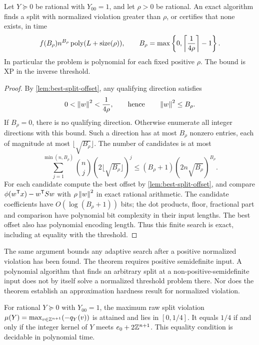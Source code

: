 \begin{theorem}\label{thm:threshold-separation}
Let $Y\succeq0$ be rational with $Y_{00}=1$, and let $\rho>0$ be rational.
An exact algorithm finds a split with normalized violation greater than
$\rho$, or certifies that none exists, in time
\[
 f(B_\rho)n^{B_\rho}\operatorname{poly}(L+\operatorname{size}(\rho)),
 \qquad B_\rho=\max\left\{0,
             \left\lceil\frac1{4\rho}\right\rceil-1\right\}.
\]
In particular the problem is polynomial for each fixed positive
$\rho$. The bound is XP in the inverse threshold.
\end{theorem}

\begin{proof}
By \cref{lem:best-split-offset}, any qualifying direction satisfies
\[
 0<\left\lVert w\right\rVert^2<\frac1{4\rho},
 \qquad\text{hence}\qquad \left\lVert w\right\rVert^2\le B_\rho.
\]
If $B_\rho=0$, there is no qualifying direction. Otherwise enumerate all
integer directions with this bound. Such a direction has at most
$B_\rho$ nonzero entries, each of magnitude at most
$\lfloor\sqrt{B_\rho}\rfloor$. The number of candidates is at most
\[
 \sum_{j=1}^{\min(n,B_\rho)}
 \binom nj(2\lfloor\sqrt{B_\rho}\rfloor)^j
 \le (B_\rho+1)(2n\sqrt{B_\rho})^{B_\rho}.
\]
For each candidate compute the best offset by
\cref{lem:best-split-offset}, and compare
$\phi(w^{\mathsf T} x)-w^{\mathsf T} Sw$ with $\rho\left\lVert w\right\rVert^2$ in exact rational
arithmetic. The candidate coefficients have $O(\log(B_\rho+1))$ bits;
the dot products, floor, fractional part and comparison have polynomial
bit complexity in their input lengths. The best offset also has
polynomial encoding length. Thus this finite search is exact, including
at equality with the threshold.
\end{proof}

The same argument bounds any adaptive search after a positive normalized
violation has been found. The theorem requires positive semidefinite
input. A polynomial algorithm that finds an arbitrary split at a
non-positive-semidefinite input does not by itself solve a normalized
threshold problem there. Nor does the theorem establish an approximation
hardness result for normalized violation.

\begin{proposition}\label{prop:raw-quarter}
For rational $Y\succeq0$ with $Y_{00}=1$, the maximum raw split violation
$\mu(Y)=\max_{v\in\mathbb Z^{n+1}}(-q_Y(v))$ is attained and lies in $[0,1/4]$.
It equals $1/4$ if and only if the integer kernel of $Y$ meets
$e_0+2\mathbb Z^{n+1}$. This equality condition is decidable in polynomial time.
\end{proposition}

